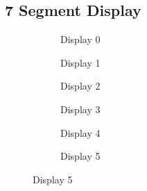 \documentclass[10pt,a4paper]{article}
\begin{document}
	\subsection{7 Segment Display}
		\begin{figure}[H]
			\begin{subfigure}{3cm}
				\caption{Display 0}
			\end{subfigure}
			\begin{subfigure}{3cm}
				\caption{Display 1}
			\end{subfigure}
			\begin{subfigure}{3cm}
				\caption{Display 2}
			\end{subfigure}
		
			\begin{subfigure}{3cm}
				\caption{Display 3}
			\end{subfigure}
			\begin{subfigure}{3cm}
				\caption{Display 4}
			\end{subfigure}	
			\begin{subfigure}{3cm}
				\caption{Display 5}
			\end{subfigure}		
		

\end{figure}
\end{document}
